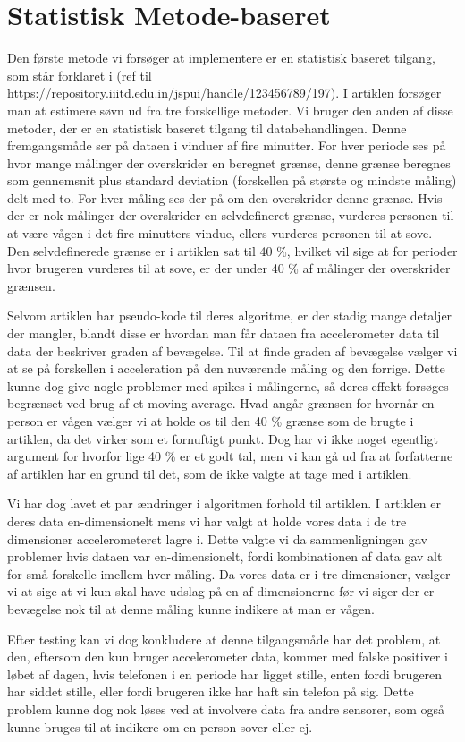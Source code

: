 \section{Statistisk Metode-baseret}
Den første metode vi forsøger at implementere er en statistisk baseret tilgang, som står forklaret i (ref til https://repository.iiitd.edu.in/jspui/handle/123456789/197).
I artiklen forsøger man at estimere søvn ud fra tre forskellige metoder.
Vi bruger den anden af disse metoder, der er en statistisk baseret tilgang til databehandlingen.
Denne fremgangsmåde ser på dataen i vinduer af fire minutter.
For hver periode ses på hvor mange målinger der overskrider en beregnet grænse, denne grænse beregnes som gennemsnit plus standard deviation (forskellen på største og mindste måling) delt med to.
For hver måling ses der på om den overskrider denne grænse.
Hvis der er nok målinger der overskrider en selvdefineret grænse, vurderes personen til at være vågen i det fire minutters vindue, ellers vurderes personen til at sove.
Den selvdefinerede grænse er i artiklen sat til 40 \%, hvilket vil sige at for perioder hvor brugeren vurderes til at sove, er der under 40 \% af målinger der overskrider grænsen.

Selvom artiklen har pseudo-kode til deres algoritme, er der stadig mange detaljer der mangler, blandt disse er hvordan man får dataen fra accelerometer data til data der beskriver graden af bevægelse.
Til at finde graden af bevægelse vælger vi at se på forskellen i acceleration på den nuværende måling og den forrige.
Dette kunne dog give nogle problemer med spikes i målingerne, så deres effekt forsøges begrænset ved brug af et moving average.
Hvad angår grænsen for hvornår en person er vågen vælger vi at holde os til den 40 \% grænse som de brugte i artiklen, da det virker som et fornuftigt punkt.
Dog har vi ikke noget egentligt argument for hvorfor lige 40 \% er et godt tal, men vi kan gå ud fra at forfatterne af artiklen har en grund til det, som de ikke valgte at tage med i artiklen.

Vi har dog lavet et par ændringer i algoritmen forhold til artiklen.
I artiklen er deres data en-dimensionelt mens vi har valgt at holde vores data i de tre dimensioner accelerometeret lagre i.
Dette valgte vi da sammenligningen gav problemer hvis dataen var en-dimensionelt, fordi kombinationen af data gav alt for små forskelle imellem hver måling.
Da vores data er i tre dimensioner, vælger vi at sige at vi kun skal have udslag på en af dimensionerne før vi siger der er bevægelse nok til at denne måling kunne indikere at man er vågen.

Efter testing kan vi dog konkludere at denne tilgangsmåde har det problem, at den, eftersom den kun bruger accelerometer data, kommer med falske positiver i løbet af dagen, hvis telefonen i en periode har ligget stille, enten fordi brugeren har siddet stille, eller fordi brugeren ikke har haft sin telefon på sig.
Dette problem kunne dog nok løses ved at involvere data fra andre sensorer, som også kunne bruges til at indikere om en person sover eller ej. 